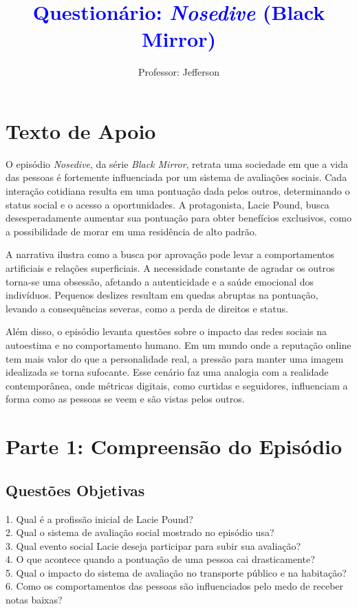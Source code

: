 \documentclass[11pt]{article}
\title{\textcolor{blue}{Questionário: \textit{Nosedive} (Black Mirror)}}
\author{Professor: Jefferson}
\date{}
\begin{document}
\maketitle
\vspace{-1cm}

\begin{multicols}{2}

\section*{Texto de Apoio}

O episódio \textit{Nosedive}, da série \textit{Black Mirror}, retrata uma sociedade em que a vida das pessoas é fortemente influenciada por um sistema de avaliações sociais. Cada interação cotidiana resulta em uma pontuação dada pelos outros, determinando o status social e o acesso a oportunidades. A protagonista, Lacie Pound, busca desesperadamente aumentar sua pontuação para obter benefícios exclusivos, como a possibilidade de morar em uma residência de alto padrão.

A narrativa ilustra como a busca por aprovação pode levar a comportamentos artificiais e relações superficiais. A necessidade constante de agradar os outros torna-se uma obsessão, afetando a autenticidade e a saúde emocional dos indivíduos. Pequenos deslizes resultam em quedas abruptas na pontuação, levando a consequências severas, como a perda de direitos e status.

Além disso, o episódio levanta questões sobre o impacto das redes sociais na autoestima e no comportamento humano. Em um mundo onde a reputação online tem mais valor do que a personalidade real, a pressão para manter uma imagem idealizada se torna sufocante. Esse cenário faz uma analogia com a realidade contemporânea, onde métricas digitais, como curtidas e seguidores, influenciam a forma como as pessoas se veem e são vistas pelos outros.

\section*{Parte 1: Compreensão do Episódio}

\subsection*{Questões Objetivas}

1. Qual é a profissão inicial de Lacie Pound?\\
2. Qual o sistema de avaliação social mostrado no episódio usa?\\
3. Qual evento social Lacie deseja participar para subir sua avaliação?\\
4. O que acontece quando a pontuação de uma pessoa cai drasticamente?\\
5. Qual o impacto do sistema de avaliação no transporte público e na habitação?\\
6. Como os comportamentos das pessoas são influenciados pelo medo de receber notas baixas?\\


\end{multicols}
\end{document}
